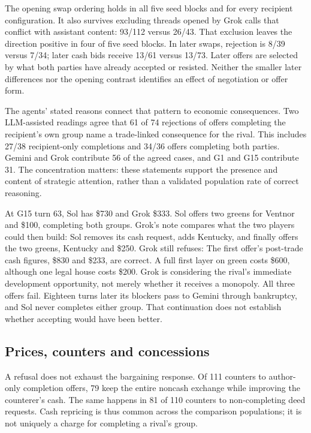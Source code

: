 The opening swap ordering holds in all five seed blocks and for every recipient configuration. It also survives excluding threads opened by Grok calls that conflict with assistant content: 93/112 versus 26/43. That exclusion leaves the direction positive in four of five seed blocks. In later swaps, rejection is 8/39 versus 7/34; later cash bids receive 13/61 versus 13/73. Later offers are selected by what both parties have already accepted or resisted. Neither the smaller later differences nor the opening contrast identifies an effect of negotiation or offer form.



The agents' stated reasons connect that pattern to economic consequences. Two LLM-assisted readings agree that 61 of 74 rejections of offers completing the recipient's own group name a trade-linked consequence for the rival. This includes 27/38 recipient-only completions and 34/36 offers completing both parties. Gemini and Grok contribute 56 of the agreed cases, and G1 and G15 contribute 31. The concentration matters: these statements support the presence and content of strategic attention, rather than a validated population rate of correct reasoning.

At G15 turn 63, Sol has \$730 and Grok \$333. Sol offers two greens for Ventnor and \$100, completing both groups. Grok's note compares what the two players could then build:
Sol removes its cash request, adds Kentucky, and finally offers the two greens, Kentucky and \$250. Grok still refuses:
The first offer's post-trade cash figures, \$830 and \$233, are correct. A full first layer on green costs \$600, although one legal house costs \$200. Grok is considering the rival's immediate development opportunity, not merely whether it receives a monopoly. All three offers fail. Eighteen turns later its blockers pass to Gemini through bankruptcy, and Sol never completes either group. That continuation does not establish whether accepting would have been better.

\subsection{Prices, counters and concessions}
A refusal does not exhaust the bargaining response. Of 111 counters to author-only completion offers, 79 keep the entire noncash exchange while improving the counterer's cash. The same happens in 81 of 110 counters to non-completing deed requests. Cash repricing is thus common across the comparison populations; it is not uniquely a charge for completing a rival's group.

